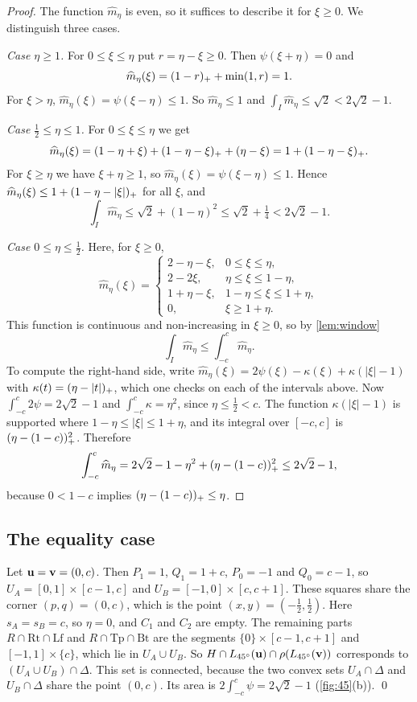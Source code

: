 \begin{proof}
The function $\widehat m_\eta$ is even, so it suffices to describe it for $\xi\ge0$. We distinguish three cases.

\emph{Case $\eta\ge1$.} For $0\le \xi\le\eta$ put $r=\eta-\xi\ge0$. Then $\psi(\xi+\eta)=0$ and
\[
\widehat m_\eta(\xi)=(1-r)_{+}+\min(1,r)=1.
\]
For $\xi>\eta$, $\widehat m_\eta(\xi)=\psi(\xi-\eta)\le1$. So $\widehat m_\eta\le1$ and $\int_I\widehat m_\eta\le\sqrt2<2\sqrt2-1$.

\emph{Case $\tfrac12\le\eta\le1$.} For $0\le \xi\le\eta$ we get
\[
\widehat m_\eta(\xi)=(1-\eta+\xi)+(1-\eta-\xi)_{+}+(\eta-\xi)=1+(1-\eta-\xi)_{+}.
\]
For $\xi\ge\eta$ we have $\xi+\eta\ge1$, so $\widehat m_\eta(\xi)=\psi(\xi-\eta)\le1$. Hence $\widehat m_\eta(\xi)\le1+(1-\eta-|\xi|)_{+}$ for all $\xi$, and
\[
\int_I\widehat m_\eta\le\sqrt2+(1-\eta)^2\le\sqrt2+\tfrac14<2\sqrt2-1 .
\]

\emph{Case $0\le\eta\le\tfrac12$.} Here, for $\xi\ge0$,
\[
\widehat m_\eta(\xi)=
\begin{cases}
2-\eta-\xi, & 0\le\xi\le\eta,\\
2-2\xi, & \eta\le\xi\le1-\eta,\\
1+\eta-\xi, & 1-\eta\le\xi\le1+\eta,\\
0, & \xi\ge1+\eta.
\end{cases}
\]
This function is continuous and non-increasing in $\xi\ge0$, so by \cref{lem:window}
\[
\int_I\widehat m_\eta\le\int_{-c}^{c}\widehat m_\eta .
\]
To compute the right-hand side, write $\widehat m_\eta(\xi)=2\psi(\xi)-\kappa(\xi)+\kappa(|\xi|-1)$ with $\kappa(t)=(\eta-|t|)_{+}$, which one checks on each of the intervals above. Now $\int_{-c}^{c}2\psi=2\sqrt2-1$ and $\int_{-c}^{c}\kappa=\eta^2$, since $\eta\le\frac12<c$. The function $\kappa(|\xi|-1)$ is supported where $1-\eta\le|\xi|\le1+\eta$, and its integral over $[-c,c]$ is $(\eta-(1-c))_{+}^2$. Therefore
\[
\int_{-c}^{c}\widehat m_\eta=2\sqrt2-1-\eta^2+(\eta-(1-c))_{+}^2\le2\sqrt2-1,
\]
because $0<1-c$ implies $(\eta-(1-c))_{+}\le\eta$.
\end{proof}

\subsection*{The equality case}
Let $\mathbf{u}=\mathbf{v}=(0,c)$. Then $P_1=1$, $Q_1=1+c$, $P_0=-1$ and $Q_0=c-1$, so $U_A=[0,1]\times[c-1,c]$ and $U_B=[-1,0]\times[c,c+1]$. These squares share the corner $(p,q)=(0,c)$, which is the point $(x,y)=(-\frac12,\frac12)$. Here $s_A=s_B=c$, so $\eta=0$, and $C_1$ and $C_2$ are empty. The remaining parts $R\cap\mathrm{Rt}\cap\mathrm{Lf}$ and $R\cap\mathrm{Tp}\cap\mathrm{Bt}$ are the segments $\{0\}\times[c-1,c+1]$ and $[-1,1]\times\{c\}$, which lie in $U_A\cup U_B$. So $H\cap L_{45^{\circ}}(\mathbf{u})\cap\rho(L_{45^{\circ}}(\mathbf{v}))$ corresponds to $(U_A\cup U_B)\cap\Delta$. This set is connected, because the two convex sets $U_A\cap\Delta$ and $U_B\cap\Delta$ share the point $(0,c)$. Its area is $2\int_{-c}^{c}\psi=2\sqrt2-1$ (\cref{fig:45}(b)). \qed
